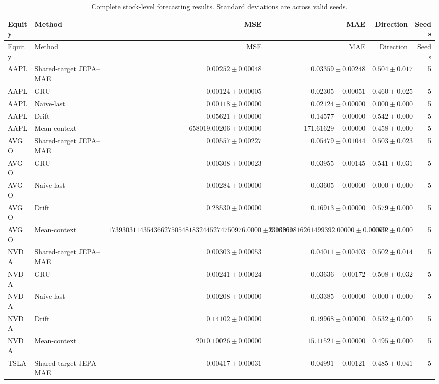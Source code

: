 \begin{longtable}{llrrrr}
\caption{Complete stock-level forecasting results. Standard deviations are across valid seeds.}\label{tab:appendix_stock_metrics}\\
\toprule
Equity & Method & MSE & MAE & Direction & Seeds \\
\midrule
\endfirsthead
\toprule
Equity & Method & MSE & MAE & Direction & Seeds \\
\midrule
\endhead
AAPL & Shared-target JEPA--MAE & $0.00252 \pm 0.00048$ & $0.03359 \pm 0.00248$ & $0.504 \pm 0.017$ & 5 \\
AAPL & GRU & $0.00124 \pm 0.00005$ & $0.02305 \pm 0.00051$ & $0.460 \pm 0.025$ & 5 \\
AAPL & Naive-last & $0.00118 \pm 0.00000$ & $0.02124 \pm 0.00000$ & $0.000 \pm 0.000$ & 5 \\
AAPL & Drift & $0.05621 \pm 0.00000$ & $0.14577 \pm 0.00000$ & $0.542 \pm 0.000$ & 5 \\
AAPL & Mean-context & $658019.00206 \pm 0.00000$ & $171.61629 \pm 0.00000$ & $0.458 \pm 0.000$ & 5 \\
AVGO & Shared-target JEPA--MAE & $0.00557 \pm 0.00227$ & $0.05479 \pm 0.01044$ & $0.503 \pm 0.023$ & 5 \\
AVGO & GRU & $0.00308 \pm 0.00023$ & $0.03955 \pm 0.00145$ & $0.541 \pm 0.031$ & 5 \\
AVGO & Naive-last & $0.00284 \pm 0.00000$ & $0.03605 \pm 0.00000$ & $0.000 \pm 0.000$ & 5 \\
AVGO & Drift & $0.28530 \pm 0.00000$ & $0.16913 \pm 0.00000$ & $0.579 \pm 0.000$ & 5 \\
AVGO & Mean-context & $173930311435436627505481832445274750976.00000 \pm 0.00000$ & $2343864816261499392.00000 \pm 0.00000$ & $0.532 \pm 0.000$ & 5 \\
NVDA & Shared-target JEPA--MAE & $0.00303 \pm 0.00053$ & $0.04011 \pm 0.00403$ & $0.502 \pm 0.014$ & 5 \\
NVDA & GRU & $0.00241 \pm 0.00024$ & $0.03636 \pm 0.00172$ & $0.508 \pm 0.032$ & 5 \\
NVDA & Naive-last & $0.00208 \pm 0.00000$ & $0.03385 \pm 0.00000$ & $0.000 \pm 0.000$ & 5 \\
NVDA & Drift & $0.14102 \pm 0.00000$ & $0.19968 \pm 0.00000$ & $0.532 \pm 0.000$ & 5 \\
NVDA & Mean-context & $2010.10026 \pm 0.00000$ & $15.11521 \pm 0.00000$ & $0.495 \pm 0.000$ & 5 \\
TSLA & Shared-target JEPA--MAE & $0.00417 \pm 0.00031$ & $0.04991 \pm 0.00121$ & $0.485 \pm 0.041$ & 5 \\

\end{longtable}
